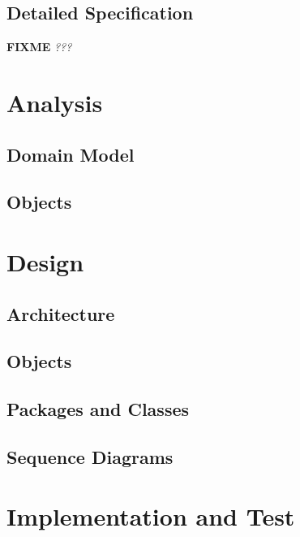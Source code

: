 \documentclass[a4paper,parskip=full]{scrreprt}
\newcommand{\fixme}[1]{\textbf{FIXME} \emph{#1}}
\begin{document}
\section{Detailed Specification}
\fixme{???}

\chapter{Analysis}

\section{Domain Model}

\section{Objects}


\chapter{Design}

\section{Architecture}

\section{Objects}

\section{Packages and Classes}

\section{Sequence Diagrams}


\chapter{Implementation and Test}
\end{document}
